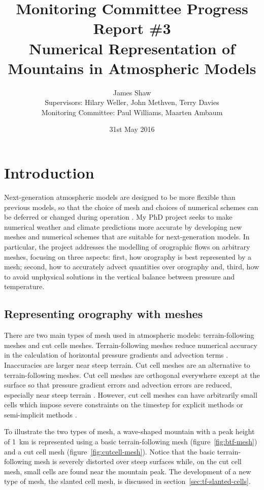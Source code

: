 \documentclass[a4paper,11pt]{article}
\title{
\vspace*{-2em}
Monitoring Committee Progress Report \#3\\
\vspace*{1em}
\Large{Numerical Representation of Mountains in Atmospheric Models}}
\author{James Shaw
\vspace{0.5em} \\
\large{Supervisors: Hilary Weller, John Methven, Terry Davies}
\vspace{0.5em} \\
\large{Monitoring Committee: Paul Williams, Maarten Ambaum}}
\date{31st May 2016}
\begin{document}
\newcommand{\exner}{\Pi}
\maketitle

\section{Introduction}

Next-generation atmospheric models are designed to be more flexible than previous models, so that the choice of mesh and choices of numerical schemes can be deferred or changed during operation \citep{ford2013,theurich2015}.
My PhD project seeks to make numerical weather and climate predictions more accurate by developing new meshes and numerical schemes that are suitable for next-generation models.
In particular, the project addresses the modelling of orographic flows on arbitrary meshes, focusing on three aspects: first, how orography is best represented by a mesh; second, how to accurately advect quantities over orography and, third, how to avoid unphysical solutions in the vertical balance between pressure and temperature.

\subsection*{Representing orography with meshes}

There are two main types of mesh used in atmospheric models: terrain-following meshes and cut cells meshes.
Terrain-following meshes reduce numerical accuracy in the calculation of horizontal pressure gradients \citep{gary1973,zaengl2012} and advection terms \citep{schaer2002}.  Inaccuracies are larger near steep terrain.
Cut cell meshes are an alternative to terrain-following meshes.  Cut cell meshes are orthogonal everywhere except at the surface so that pressure gradient errors and advection errors are reduced, especially near steep terrain \citep{lock2012,good2014}.  However, cut cell meshes can have arbitrarily small cells which impose severe constraints on the timestep for explicit methods or semi-implicit methods \citep{almgren1997}.

To illustrate the two types of mesh, a wave-shaped mountain with a peak height of \SI{1}{\kilo\meter} is represented using a basic terrain-following mesh (figure~\ref{fig:btf-mesh}) and a cut cell mesh (figure~\ref{fig:cutcell-mesh}).  Notice that the basic terrain-following mesh is severely distorted over steep surfaces while, on the cut cell mesh, small cells are found near the mountain peak.
The development of a new type of mesh, the slanted cell mesh, is discussed in section~\ref{sec:tf-slanted-cells}.
\end{document}
